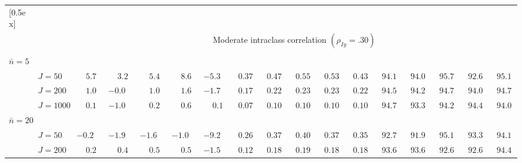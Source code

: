 \begin{sidewaystable}
\begin{threeparttable}
\begin{tabular}{llccccccccccccccc}
[0.5ex]\hline\\[-1.6ex] 
& & \multicolumn{15}{c}{Moderate intraclass correlation $(\rho_{Iy}=.30)$} \\[0.6ex]\hline\\[-1.8ex]
\multicolumn{4}{l}{$\bar{n}=5$} \\  & \nopagebreak $\;J=50$  & $\phantom{-}5.7\phantom{0}$ & $\phantom{-}3.2\phantom{0}$ & $\phantom{-}5.4\phantom{0}$ & $\phantom{-}8.6\phantom{0}$ & ${-}5.3\phantom{0}$ & $\phantom{0}0.37\phantom{0}$ & $\phantom{0}0.47\phantom{0}$ & $\phantom{0}0.55\phantom{0}$ & $\phantom{0}0.53\phantom{0}$ & $\phantom{0}0.43\phantom{0}$ & $\phantom{0}94.1\phantom{0}$ & $\phantom{0}94.0\phantom{0}$ & $\phantom{0}95.7\phantom{0}$ & $\phantom{0}92.6\phantom{0}$ & $\phantom{0}95.1\phantom{0}$ \\
 & \nopagebreak $\;J=200$  & $\phantom{-}1.0\phantom{0}$ & ${-}0.0\phantom{0}$ & $\phantom{-}1.0\phantom{0}$ & $\phantom{-}1.6\phantom{0}$ & ${-}1.7\phantom{0}$ & $\phantom{0}0.17\phantom{0}$ & $\phantom{0}0.22\phantom{0}$ & $\phantom{0}0.23\phantom{0}$ & $\phantom{0}0.23\phantom{0}$ & $\phantom{0}0.22\phantom{0}$ & $\phantom{0}94.5\phantom{0}$ & $\phantom{0}94.2\phantom{0}$ & $\phantom{0}94.7\phantom{0}$ & $\phantom{0}94.0\phantom{0}$ & $\phantom{0}94.7\phantom{0}$ \\
 & \nopagebreak $\;J=1000$  & $\phantom{-}0.1\phantom{0}$ & ${-}1.0\phantom{0}$ & $\phantom{-}0.2\phantom{0}$ & $\phantom{-}0.6\phantom{0}$ & $\phantom{-}0.1\phantom{0}$ & $\phantom{0}0.07\phantom{0}$ & $\phantom{0}0.10\phantom{0}$ & $\phantom{0}0.10\phantom{0}$ & $\phantom{0}0.10\phantom{0}$ & $\phantom{0}0.10\phantom{0}$ & $\phantom{0}94.7\phantom{0}$ & $\phantom{0}93.3\phantom{0}$ & $\phantom{0}94.2\phantom{0}$ & $\phantom{0}94.4\phantom{0}$ & $\phantom{0}94.0\phantom{0}$ \\
\multicolumn{4}{l}{$\bar{n}=20$} \\  & \nopagebreak $\;J=50$  & ${-}0.2\phantom{0}$ & ${-}1.9\phantom{0}$ & ${-}1.6\phantom{0}$ & ${-}1.0\phantom{0}$ & ${-}9.2\phantom{0}$ & $\phantom{0}0.26\phantom{0}$ & $\phantom{0}0.37\phantom{0}$ & $\phantom{0}0.40\phantom{0}$ & $\phantom{0}0.37\phantom{0}$ & $\phantom{0}0.35\phantom{0}$ & $\phantom{0}92.7\phantom{0}$ & $\phantom{0}91.9\phantom{0}$ & $\phantom{0}95.1\phantom{0}$ & $\phantom{0}93.3\phantom{0}$ & $\phantom{0}94.1\phantom{0}$ \\
 & \nopagebreak $\;J=200$  & $\phantom{-}0.2\phantom{0}$ & $\phantom{-}0.4\phantom{0}$ & $\phantom{-}0.5\phantom{0}$ & $\phantom{-}0.5\phantom{0}$ & ${-}1.5\phantom{0}$ & $\phantom{0}0.12\phantom{0}$ & $\phantom{0}0.18\phantom{0}$ & $\phantom{0}0.19\phantom{0}$ & $\phantom{0}0.18\phantom{0}$ & $\phantom{0}0.18\phantom{0}$ & $\phantom{0}93.6\phantom{0}$ & $\phantom{0}93.6\phantom{0}$ & $\phantom{0}92.6\phantom{0}$ & $\phantom{0}92.6\phantom{0}$ & $\phantom{0}94.4\phantom{0}$ \\

\end{tabular}
\end{threeparttable}
\end{sidewaystable}
